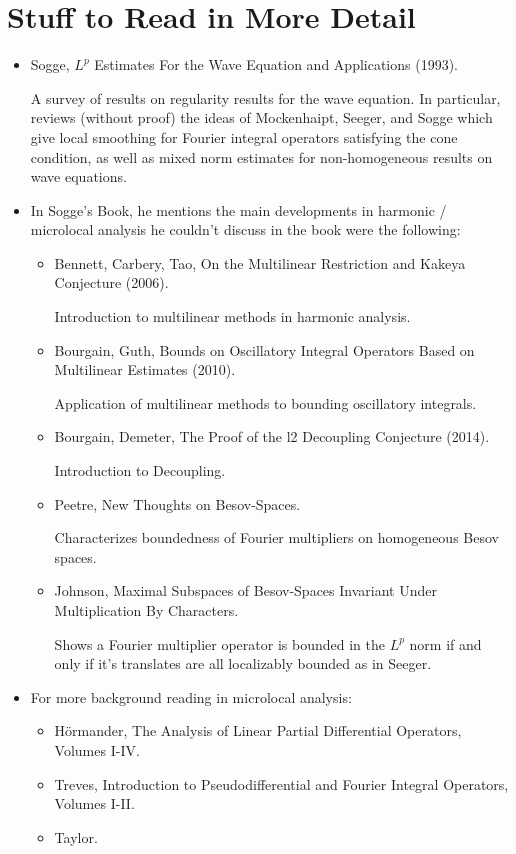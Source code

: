 \chapter{Stuff to Read in More Detail}

\begin{itemize}
    \item Sogge, $L^p$ Estimates For the Wave Equation and Applications (1993).

    A survey of results on regularity results for the wave equation. In particular, reviews (without proof) the ideas of Mockenhaipt, Seeger, and Sogge which give local smoothing for Fourier integral operators satisfying the cone condition, as well as mixed norm estimates for non-homogeneous results on wave equations.

    \item In Sogge's Book, he mentions the main developments in harmonic / microlocal analysis he couldn't discuss in the book were the following:
    \begin{itemize}
        \item Bennett, Carbery, Tao, On the Multilinear Restriction and Kakeya Conjecture (2006).

        Introduction to multilinear methods in harmonic analysis.

        \item Bourgain, Guth, Bounds on Oscillatory Integral Operators Based on Multilinear Estimates (2010).

        Application of multilinear methods to bounding oscillatory integrals.

        \item Bourgain, Demeter, The Proof of the l2 Decoupling Conjecture (2014).

        Introduction to Decoupling.

        \item Peetre, New Thoughts on Besov-Spaces.

        Characterizes boundedness of Fourier multipliers on homogeneous Besov spaces.

        \item Johnson, Maximal Subspaces of Besov-Spaces Invariant Under Multiplication By Characters.

            Shows a Fourier multiplier operator is bounded in the $L^p$ norm if and only if it's translates are all localizably bounded as in Seeger.
    \end{itemize}

    \item For more background reading in microlocal analysis:
    \begin{itemize}
        \item H\"{o}rmander, The Analysis of Linear Partial Differential Operators, Volumes I-IV.
        \item Treves, Introduction to Pseudodifferential and Fourier Integral Operators, Volumes I-II.
        \item Taylor.
    \end{itemize}


\end{itemize}
